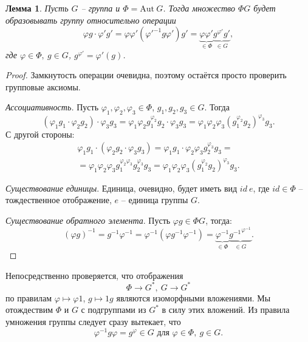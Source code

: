 \documentclass{article}
\newtheorem{lemma}{Лемма}[section]
\begin{document}
\begin{lemma} \label{ngore}
    Пусть $G$ -- группа и $\Phi = \mathrm{Aut} \ G$. Тогда множество $\Phi G$ будет образовывать группу относительно операции $$ \varphi g \cdot \varphi' g' = \varphi \varphi' ({\varphi'}^{-1} g \varphi') g' = \underbrace{\varphi \varphi'}_{\in \Phi} \underbrace{g^{\varphi'} g'}_{\in G}, $$ где $\varphi \in \Phi, \ g \in G$, $g^{\varphi'} = \varphi'(g)$.
\end{lemma}
\begin{proof}
    Замкнутость операции очевидна, поэтому остаётся просто проверить групповые аксиомы.

    \textit{Ассоциативность.} Пусть $ \varphi_1, \varphi_2, \varphi_3 \in \Phi $, $g_1, g_2, g_3 \in G$. Тогда $$ (\varphi_1 g_1 \cdot \varphi_2 g_2) \cdot \varphi_3 g_3 = \varphi_1 \varphi_2 g_1^{\varphi_2} g_2 \cdot \varphi_3 g_3 = \varphi_1 \varphi_2 \varphi_3 (g_1^{\varphi_2} g_2)^{\varphi_3} g_3. $$
    С другой стороны:
    \begin{multline*}
        \varphi_1 g_1 \cdot (\varphi_2 g_2 \cdot \varphi_3 g_3) = \varphi_1 g_1 \cdot \varphi_2 \varphi_3 g_2^{\varphi_3} g_3 = \\
        = \varphi_1 \varphi_2 \varphi_3 g_1^{\varphi_2 \varphi_3} g_2^{\varphi_3} g_3 = \varphi_1 \varphi_2 \varphi_3 (g_1^{\varphi_2} g_2)^{\varphi_3} g_3.
    \end{multline*}

    \textit{Существование единицы}. Единица, очевидно, будет иметь вид $ id \ e $, где $id \in \Phi$ -- тождественное отображение, $e$ -- единица группы $G$.

    \textit{Существование обратного элемента}. Пусть $\varphi g \in \Phi G$, тогда:
    \[
        (\varphi g)^{-1} = g^{-1} \varphi^{-1} = \varphi^{-1} (\varphi g^{-1} \varphi^{-1}) = \underbrace{\varphi^{-1}}_{\in \Phi} \underbrace{{g^{-1}}^{\varphi^{-1}}}_{\in G}.
    \]
\end{proof}

Непосредственно проверяется, что отображения $$ \Phi \rightarrow G^*, \ G \rightarrow G^* $$ по правилам $\varphi \mapsto \varphi 1$, $g \mapsto 1 g$ являются изоморфными вложениями. Мы отождествим $\Phi$ и $G$ с подгруппами из $G^*$ в силу этих вложений. Из правила умножения группы следует сразу вытекает, что
\begin{equation} \tag{*} \label{eq_3E}
    \varphi^{-1} g \varphi = g^{\varphi} \in G \text{ для } \varphi \in \Phi, \ g \in G.
\end{equation}
\end{document}
